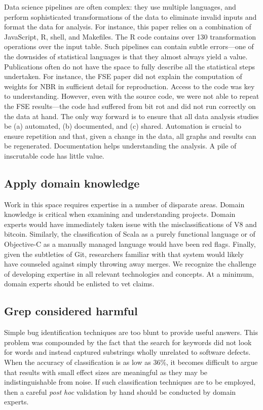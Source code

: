 \documentclass[acmsmall]{acmart}
\newcommand{\objc}{{\sf  Objective-C}\xspace}
\newcommand{\scala}{{\sf  Scala}\xspace}
\newcommand{\js}{{\sf  JavaScript}\xspace}
\begin{document}
Data science pipelines are often complex: they use multiple languages, and
perform sophisticated transformations of the data to eliminate invalid
inputs and format the data for analysis. For instance, this paper relies on
a combination of {\small \js}, {\sf\small R}, {\sf\small shell}, and {\sf\small
  Makefiles}. The {\sf\small R} code contains over 130 transformation
operations over the input table.  Such pipelines can contain subtle
errors---one of the downsides of statistical languages is that they almost
always yield a value. Publications often do not have the space to fully
describe all the statistical steps undertaken. For instance, the FSE paper
did not explain the computation of weights for NBR in sufficient detail for
reproduction.  Access to the code was key to understanding.  However, even
with the source code, we were not able to repeat the FSE results---the code
had suffered from bit rot and did not run correctly on the data at hand.
The only way forward is to ensure that all data analysis studies be (a)
automated, (b) documented, and (c) shared.  Automation is crucial to ensure
repetition and that, given a change in the data, all graphs and results can
be regenerated. Documentation helps understanding the analysis. A pile of
inscrutable code has little value.

\subsection{Apply domain knowledge} 
Work in this space requires expertise in a number of disparate areas.
Domain knowledge is critical when examining and understanding
projects. Domain experts would have immediately taken issue with the misclassifications of V8 and
bitcoin. Similarly, the classification of \scala as a purely functional
language or of \objc as a manually managed language would have been red
flags. Finally, given the subtleties of Git, researchers familiar with that
system would likely have counseled against simply throwing away merges. We
recognize the challenge of developing expertise in all relevant technologies
and concepts. At a minimum, domain experts should be enlisted to vet claims.

\subsection{Grep considered harmful} 
Simple bug identification techniques are too blunt to provide useful
answers.  This problem was compounded by the fact that the search for
keywords did not look for words and instead captured substrings wholly
unrelated to software defects. When the accuracy of classification is as low
as 36\%, it becomes difficult to argue that results with small effect sizes
are meaningful as they may be indistinguishable from noise.  If such
classification techniques are to be employed, then a careful \emph{post hoc}
validation by hand should be conducted by domain experts.
\end{document}
